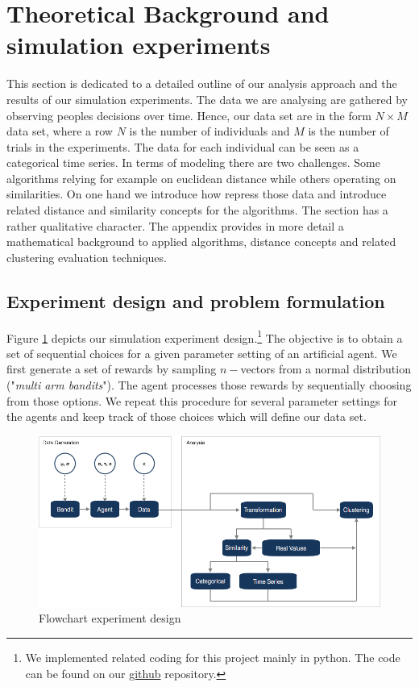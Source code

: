 \documentclass[12pt,a4paper,bibliography=totocnumbered,listof=totocnumbered]{scrartcl}
\begin{document}

\section{Theoretical Background and simulation experiments}

This section is dedicated to a detailed outline of our analysis approach and the results of our simulation experiments. The data we are analysing are gathered by observing peoples decisions over time. Hence, our data set are in the form $N \times M$ data set, where a row $N$ is the number of individuals and $M$ is the number of trials in the experiments. The data for each individual can be seen as a categorical time series. In terms of modeling there are two challenges. Some algorithms relying for example on euclidean distance while others operating on similarities. On one hand we introduce how repress those data and introduce related distance and similarity concepts for the algorithms. The section has a rather qualitative character. The appendix provides in more detail a mathematical background to applied algorithms, distance concepts and related clustering evaluation techniques. 

\subsection{Experiment design and problem formulation}

Figure \ref{fig:flow} depicts our simulation experiment design.\footnote{We implemented related coding for this project mainly in python. The code can be found on our  \href{https://github.com/FelixGSE/Master-Project}{github} repository.} The objective is to obtain a set of sequential choices for a given parameter setting of an artificial agent. We first generate a set of rewards by sampling $n-$vectors from a normal distribution ("\textit{multi arm bandits}"). The agent processes those rewards by sequentially choosing from those options. We repeat this procedure for several parameter settings for the agents and keep track of those choices which will define our data set.

 \begin{figure}[H]
	\includegraphics[width=\textwidth]{Pictures/flow01.png}
	\caption{Flowchart experiment design}
	\label{fig:flow}
\end{figure}
\end{document}
